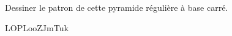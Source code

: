 
\begin{exercice}\label{exo2smath-0184}

    Dessiner le patron de cette pyramide régulière à base carré.
    \begin{center}                                       
                                               
\end{center}
    
LOPLooZJmTuk

\end{exercice}
